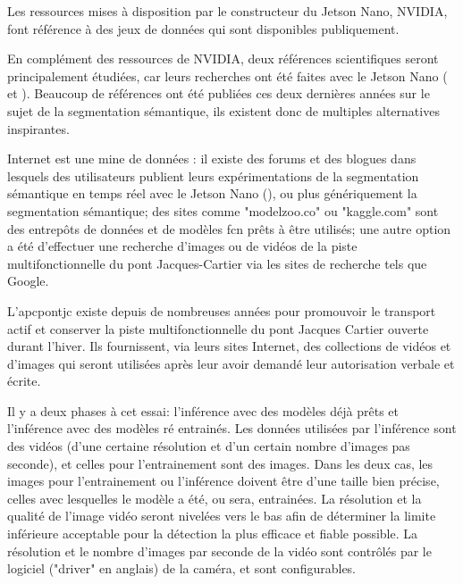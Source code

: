 ﻿\label{metho:data}
\par Les ressources mises à disposition par le constructeur du Jetson Nano, NVIDIA, font référence à des jeux de données qui sont disponibles publiquement.
\par En complément des ressources de NVIDIA, deux références scientifiques seront principalement étudiées, car leurs recherches ont été faites avec le Jetson Nano (\cite{nguyen_mavnet_2019} et \cite{chong_real-time_1992}). Beaucoup de références ont été publiées ces deux dernières années sur le sujet de la segmentation sémantique, ils existent donc de multiples alternatives inspirantes.
\par Internet est une mine de données : il existe des forums et des blogues dans lesquels des utilisateurs publient leurs expérimentations de la segmentation sémantique en temps réel avec le Jetson Nano (\cite{dustin_realtime_2019}), ou plus génériquement la segmentation sémantique; des sites comme "modelzoo.co" ou "kaggle.com" sont des entrepôts de données et de modèles \acrshort{fcn} prêts à être utilisés; une autre option a été d'effectuer une recherche d'images ou de vidéos de la piste multifonctionnelle du pont Jacques-Cartier via les sites de recherche tels que Google. 
\par L'\acrlong{apcpontjc} existe depuis de nombreuses années pour promouvoir le transport actif et conserver la piste multifonctionnelle du pont Jacques Cartier ouverte durant l'hiver. Ils fournissent, via leurs sites Internet, des collections de vidéos et d'images qui seront utilisées après leur avoir demandé leur autorisation verbale et écrite. \cite{association_des_pietons_et_cyclistes_du_pont_jacques-cartier_pontjacques-cartier365com_2020} \cite{association_des_pietons_et_cyclistes_pont_jacques-cartier_flickr_2020}
\par Il y a deux phases à cet essai: l'inférence avec des modèles déjà prêts et l'inférence avec des modèles ré entrainés. Les données utilisées par l'inférence sont des vidéos (d'une certaine résolution et d'un certain nombre d'images pas seconde), et celles pour l'entrainement sont des images. Dans les deux cas, les images pour l'entrainement ou l'inférence doivent être d'une taille bien précise, celles avec lesquelles le modèle a été, ou sera, entrainées. La résolution et la qualité de l'image vidéo seront nivelées vers le bas afin de déterminer la limite inférieure acceptable pour la détection la plus efficace et fiable possible. La résolution et le nombre d'images par seconde de la vidéo sont contrôlés par le logiciel ("driver" en anglais) de la caméra, et sont configurables. 
